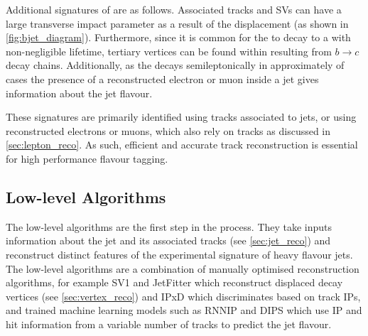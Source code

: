 Additional signatures of \bhadrons are as follows.
Associated tracks and SVs can have a large transverse impact parameter \dzero as a result of the \bhadron displacement (as shown in \cref{fig:bjet_diagram}).
Furthermore, since it is common for the \bhadron to decay to a \chadron with non-negligible lifetime, tertiary vertices can be found within \bjets resulting from $b \rightarrow c$ decay chains.
Additionally, as the \borchadron decays semileptonically in approximately  of cases \cite{Workman:2022ynf} the presence of a reconstructed electron or muon inside a jet gives information about the jet flavour.

These signatures are primarily identified using tracks associated to jets, or using reconstructed electrons or muons, which also rely on tracks as discussed in \cref{sec:lepton_reco}.
As such, efficient and accurate track reconstruction is essential for high performance flavour tagging.



\subsection{Low-level Algorithms}\label{sec:low_level_algs}

The low-level algorithms are the first step in the \btagging process.
They take inputs information about the jet and its associated tracks (see \cref{sec:jet_reco}) and reconstruct distinct features of the experimental signature of heavy flavour jets.
The low-level algorithms are a combination of manually optimised reconstruction algorithms, for example SV1 and JetFitter which reconstruct displaced decay vertices (see \cref{sec:vertex_reco}) and IPxD which discriminates based on track IPs, and trained machine learning models such as RNNIP \cite{ATL-PHYS-PUB-2017-003} and DIPS \cite{ATL-PHYS-PUB-2020-014} which use IP and hit information from a variable number of tracks to predict the jet flavour.

